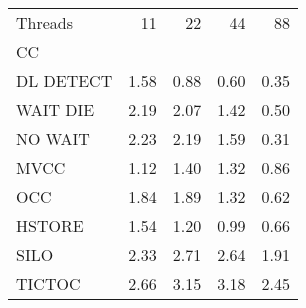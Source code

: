 \begin{tabular}{lrrrr}
\toprule
Threads &   11 &   22 &   44 &   88 \\
CC        &      &      &      &      \\
\midrule
DL DETECT & 1.58 & 0.88 & 0.60 & 0.35 \\
WAIT DIE  & 2.19 & 2.07 & 1.42 & 0.50 \\
NO WAIT   & 2.23 & 2.19 & 1.59 & 0.31 \\
MVCC      & 1.12 & 1.40 & 1.32 & 0.86 \\
OCC       & 1.84 & 1.89 & 1.32 & 0.62 \\
HSTORE    & 1.54 & 1.20 & 0.99 & 0.66 \\
SILO      & 2.33 & 2.71 & 2.64 & 1.91 \\
TICTOC    & 2.66 & 3.15 & 3.18 & 2.45 \\
\bottomrule
\end{tabular}
